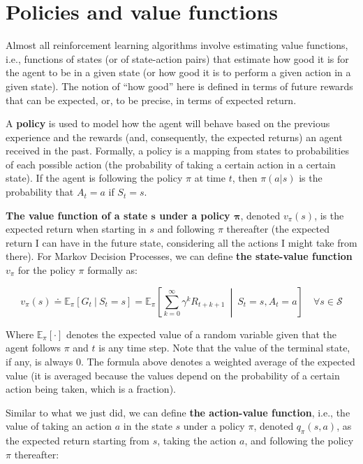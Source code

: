 \section{Policies and value functions}
Almost all reinforcement learning algorithms involve estimating value functions, i.e., functions of states (or of state-action pairs) that estimate how good it is for the agent to be in a given state (or how good it is to perform a given action in a given state). The notion of ``how good'' here is defined in terms of future rewards that can be expected, or, to be precise, in terms of expected return.

A \textbf{policy} is used to model how the agent will behave based on the previous experience and the rewards (and, consequently, the expected returns) an agent received in the past. Formally, a policy is a mapping from states to probabilities of each possible action (the probability of taking a certain action in a certain state). If the agent is following the policy $\pi$ at time $t$, then $\pi (a \vert s)$ is the probability that $A_t=a$ if $S_t=s$.

\textbf{The value function of a state $\boldsymbol{s}$ under a policy $\boldsymbol{\pi}$}, denoted $v_\pi (s)$, is the expected return when starting in $s$ and following $\pi$ thereafter (the expected return I can have in the future state, considering all the actions I might take from there). For Markov Decision Processes, we can define \textbf{the state-value function} $v_\pi$ for the policy $\pi$ formally as:

\begin{equation}
    v_\pi(s) \doteq \mathbb{E}_\pi \left[ G_t  \ \vert \  S_t = s \right] = \mathbb{E}_\pi \left[ \sum_{k=0}^{\infty}  \gamma^k R_{t+k+1} \  \middle\vert \  S_t = s, A_t = a \right] \quad \forall s \in \mathcal{S}
    \label{eq:ch2-statevaluefunction}
\end{equation}

Where $\mathbb{E}_\pi [\cdot]$ denotes the expected value of a random variable given that the agent follows $\pi$ and $t$ is any time step. Note that the value of the terminal state, if any, is always $0$. The formula above denotes a weighted average of the expected value (it is averaged because the values depend on the probability of a certain action being taken, which is a fraction).

Similar to what we just did, we can define \textbf{the action-value function}, i.e., the value of taking an action $a$ in the state $s$ under a policy $\pi$, denoted $q_\pi (s,a)$, as the expected return starting from $s$, taking the action $a$, and following the policy $\pi$ thereafter:

